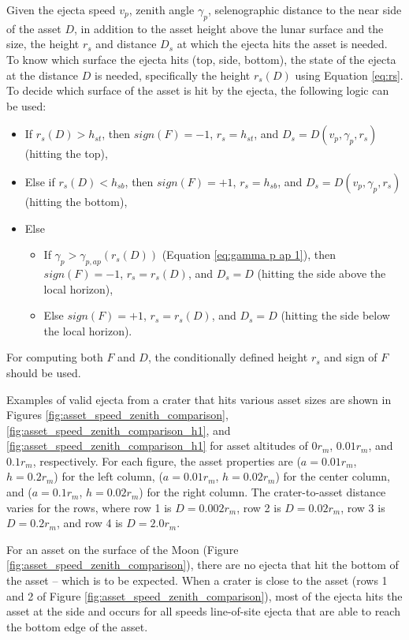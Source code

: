 \documentclass{article}
\begin{document}
Given the ejecta speed $v_p$, zenith angle $\gamma_p$, selenographic distance to the near side of the asset $D$, in addition to the asset height above the lunar surface and the size, the height $r_s$ and distance $D_s$ at which the ejecta hits the asset is needed. To know which surface the ejecta hits (top, side, bottom), the state of the ejecta at the distance $D$ is needed, specifically the height $r_s(D)$ using Equation \eqref{eq:rs}. To decide which surface of the asset is hit by the ejecta, the following logic can be used:
\begin{itemize}
	\item If $r_s(D) > h_{st}$, then $sign(F) = -1$, $r_s = h_{st}$, and $D_s = D(v_p, \gamma_p, r_s)$ (hitting the top),
	\item Else if $r_s(D) < h_{sb}$, then $sign(F) = +1$, $r_s = h_{sb}$, and $D_s = D(v_p, \gamma_p, r_s)$ (hitting the bottom),
	\item Else
	\begin{itemize}
		\item If $\gamma_p > \gamma_{p,ap}(r_s(D))$ (Equation \eqref{eq:gamma p ap 1}), then $sign(F) = -1$, $r_s = r_s(D)$, and $D_s = D$ (hitting the side above the local horizon),
		\item Else $sign(F) = +1$, $r_s = r_s(D)$, and $D_s = D$ (hitting the side below the local horizon).
	\end{itemize}
\end{itemize}
For computing both $F$ and $D$, the conditionally defined height $r_s$ and sign of $F$ should be used.

Examples of valid ejecta from a crater that hits various asset sizes are shown in Figures \ref{fig:asset_speed_zenith_comparison}, \ref{fig:asset_speed_zenith_comparison_h1}, and \ref{fig:asset_speed_zenith_comparison_h1} for asset altitudes of $0r_m$, $0.01r_m$, and $0.1r_m$, respectively. For each figure, the asset properties are ($a=0.01r_m$, $h=0.2r_m$) for the left column, ($a=0.01r_m$, $h=0.02r_m$) for the center column, and ($a=0.1r_m$, $h=0.02r_m$) for the right column. The crater-to-asset distance varies for the rows, where row 1 is $D=0.002r_m$, row 2 is $D=0.02r_m$, row 3 is $D=0.2r_m$, and row 4 is $D=2.0r_m$.

For an asset on the surface of the Moon (Figure \ref{fig:asset_speed_zenith_comparison}), there are no ejecta that hit the bottom of the asset -- which is to be expected. When a crater is close to the asset (rows 1 and 2 of Figure \ref{fig:asset_speed_zenith_comparison}), most of the ejecta hits the asset at the side and occurs for all speeds line-of-site ejecta that are able to reach the bottom edge of the asset.
\end{document}
